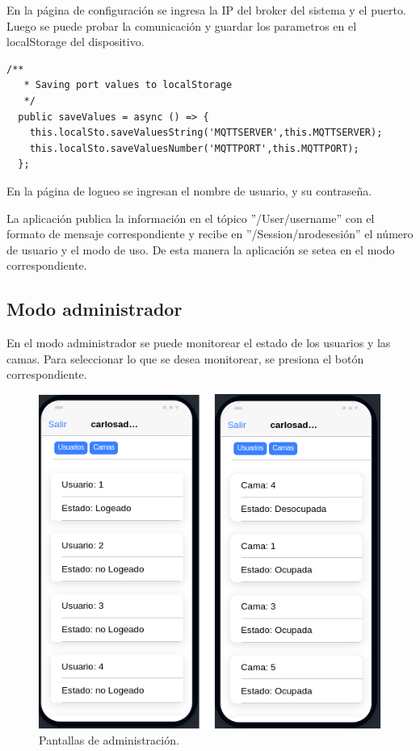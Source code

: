 En la página de configuración se ingresa la IP del broker del sistema y el puerto. Luego se puede probar la comunicación y guardar los parametros en el localStorage del dispositivo.

\begin{lstlisting}[label=cod:LocalStorage,caption=  Funciones del servicio que guardan en el localStorage]
  /**
   * Saving port values to localStorage
   */
  public saveValues = async () => {     
    this.localSto.saveValuesString('MQTTSERVER',this.MQTTSERVER);
    this.localSto.saveValuesNumber('MQTTPORT',this.MQTTPORT);
  };
\end{lstlisting}

En la página de logueo se ingresan el nombre de usuario, y su contraseña.

La aplicación publica la información en el tópico ''/User/username'' con el formato de mensaje correspondiente y recibe en ''/Session/nrodesesión'' el número de usuario y el modo de uso. De esta manera la aplicación se setea en el modo correspondiente.



\subsection{Modo administrador}
En el modo administrador se puede monitorear el estado de los usuarios y las camas. Para seleccionar lo que se desea monitorear, se presiona el botón correspondiente.

\begin{figure}[ht]
	\centering
	\includegraphics[scale=.70]{./Figures/app/administracion.png}
	\caption{ Pantallas de administración.}
	\label{fig: Pantallas de administración.}
\end{figure} 

